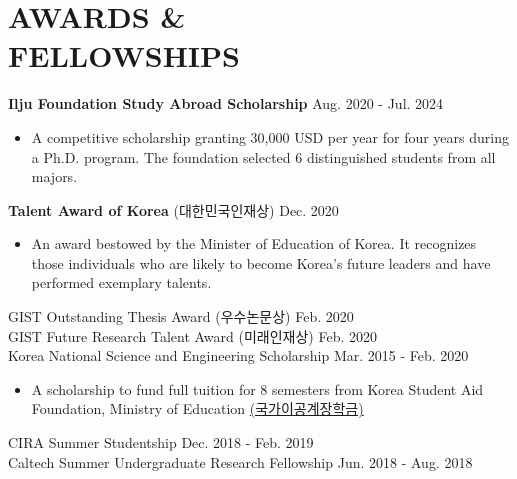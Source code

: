 \documentclass[margin, 10pt]{res} %
\begin{document}
\begin{resume}
\begin{enumerate}
\end{enumerate}





\section{AWARDS \& \\ FELLOWSHIPS}
\textbf{Ilju Foundation Study Abroad Scholarship} \hfill Aug. 2020 - Jul. 2024
\begin{itemize}
    \item[] A competitive scholarship granting 30,000 USD per year for four years during a Ph.D. program. The foundation selected 6 distinguished students from all majors.%
\end{itemize}
\textbf{Talent Award of Korea} (대한민국인재상) \hfill Dec. 2020
\begin{itemize}
    \item[] An award bestowed by the Minister of Education of Korea. It recognizes those individuals who are likely to become Korea's future leaders and have performed exemplary talents.
\end{itemize}
GIST Outstanding Thesis Award (우수논문상) \hfill Feb. 2020\\
GIST Future Research Talent Award (미래인재상) \hfill Feb. 2020\\
Korea National Science and Engineering Scholarship \hfill Mar. 2015 - Feb. 2020
\begin{itemize}
    \item[] A scholarship to fund full tuition for 8 semesters from Korea Student Aid Foundation, Ministry of Education \href{https://www.gov.kr/portal/service/serviceInfo/B55252900005}{(국가이공계장학금)}
\end{itemize}
CIRA Summer Studentship \hfill Dec. 2018 - Feb. 2019\\
Caltech Summer Undergraduate Research Fellowship \hfill Jun. 2018 - Aug. 2018\\



\end{resume}
\end{document}
